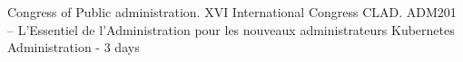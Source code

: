 
\begin{scholarship}
			{Congress of Public administration. XVI International Congress CLAD.}
			{ADM201 – L’Essentiel de l’Administration pour les nouveaux administrateurs}
				{Kubernetes Administration - 3 days}
\end{scholarship}
